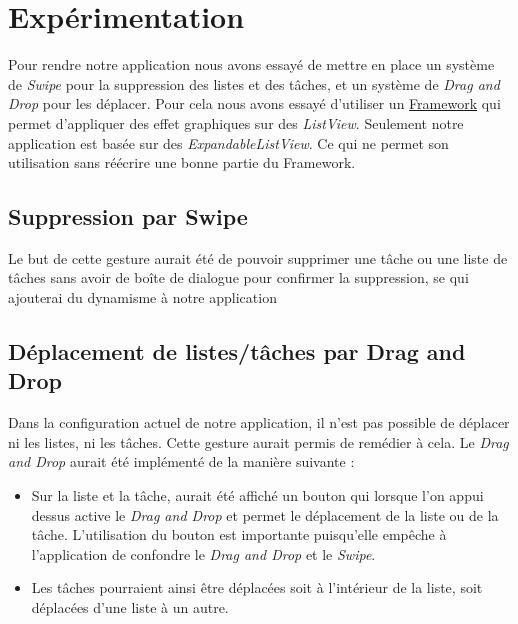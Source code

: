 \documentclass[a4paper,10pt]{article}
\begin{document}
\newpage
\section{Expérimentation}
\label{experimentation}
Pour rendre notre application nous avons essayé de mettre en place un système de \emph{Swipe} pour la suppression des listes et des tâches, et un système de
\emph{Drag and Drop} pour les déplacer. Pour cela nous avons essayé d'utiliser un \href{https://github.com/bauerca/drag-sort-listview}{Framework} qui permet
d'appliquer des effet graphiques sur des \emph{ListView}. Seulement notre application est basée sur des \emph{ExpandableListView}. Ce qui ne permet son
utilisation sans réécrire une bonne partie du Framework.

\subsection{Suppression par Swipe}
Le but de cette gesture aurait été de pouvoir supprimer une tâche ou une liste de tâches sans avoir de boîte de dialogue pour confirmer la suppression, se qui
ajouterai du dynamisme à notre application

\subsection{Déplacement de listes/tâches par Drag and Drop}
Dans la configuration actuel de notre application, il n'est pas possible de déplacer ni les listes, ni les tâches. Cette gesture aurait permis de remédier à
cela. Le \emph{Drag and Drop} aurait été implémenté de la manière suivante :
\begin{itemize}
	\item Sur la liste et la tâche, aurait été affiché un bouton qui lorsque l'on appui dessus active le \emph{Drag and Drop} et permet le déplacement de la
liste ou de la tâche. L'utilisation du bouton est importante puisqu'elle empêche à l'application de confondre le \emph{Drag and Drop} et le \emph{Swipe}.
	\item Les tâches pourraient ainsi être déplacées soit à l'intérieur de la liste, soit déplacées d'une liste à un autre.
\end{itemize}



\newpage
\end{document}
